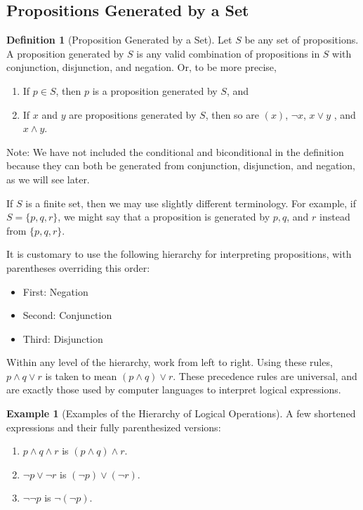 \documentclass[10pt,]{book}
\theoremstyle{plain}
\theoremstyle{definition}
\newtheorem{definition}[theorem]{Definition}
\theoremstyle{definition}
\theoremstyle{definition}
\newtheorem{example}[theorem]{Example}
\theoremstyle{definition}
\begin{document}
\subsection[Propositions Generated by a Set]{Propositions Generated by a Set}\label{proposition-generated-by-set}
\begin{definition}[Proposition Generated by a Set]\label{def-proposition-generated-by-set}
Let \(S\) be any set of propositions. A proposition generated by \(S\) is any valid combination of propositions in \(S\) with conjunction, disjunction, and negation.  Or, to be more precise,%
\par
\leavevmode%
\begin{enumerate}[label=\alph*]
\item\hypertarget{li-50}{}If \(p \in S\), then \(p\) is a proposition generated by \(S\), and %
\item\hypertarget{li-51}{}If \(x\) and \(y\) are propositions generated by \(S\), then so are \((x)\), \(\neg x\), \(x\lor y\) , and \(x\land y\).%
\end{enumerate}
%
\end{definition}
Note: We have not included the conditional and biconditional in the definition because they can both be generated from conjunction, disjunction, and negation, as we will see later.%
\par
If \(S\) is a finite set, then we may use slightly different terminology. For example, if \(S = \{p, q, r\}\), we might say that a proposition is generated by \(p, q\), and \(r\) instead from \(\{p, q, r\}\). %
\par
It is customary to use the following hierarchy for interpreting propositions, with parentheses overriding this order:
%
\par
\leavevmode%
\begin{itemize}[label=\textbullet]
\item{}First: Negation%
\item{}Second: Conjunction%
\item{}Third: Disjunction%
\end{itemize}
%
\par
Within any level of the hierarchy, work from left to right. Using these rules, \(p \land  q \lor  r\) is taken to mean \((p \land  q)\lor  r\). These precedence rules are universal, and are exactly those used by computer languages to interpret logical expressions. %
\begin{example}[Examples of the Hierarchy of Logical Operations]\label{hierarchy-examples}
 A few shortened expressions and their fully parenthesized versions:%
\par
\leavevmode%
\begin{enumerate}[label=\alph*]
\item\hypertarget{li-55}{} \(p \land  q \land  r\) is \((p \land  q) \land  r\).%
\item\hypertarget{li-56}{} \(\neg p \lor  \neg r\) is \((\neg p) \lor  (\neg r)\).%
\item\hypertarget{li-57}{}  \(\neg  \neg p\) is \(\neg (\neg p)\).%
\end{enumerate}
%
\end{example}
\end{document}
